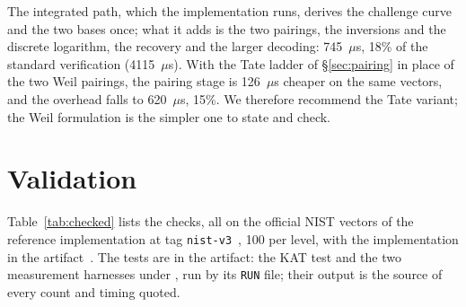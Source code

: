 \documentclass[version=submission]{iacrcc}
\begin{document}
The integrated path, which the implementation runs, derives the
challenge curve and the two bases once; what it adds is the two pairings,
the inversions and the discrete logarithm, the recovery and the larger
decoding: 745~$\mu$s, 18\% of the standard verification
(4115~$\mu$s). With the Tate ladder of \S\ref{sec:pairing} in place of the two Weil pairings, the pairing stage is 126~$\mu$s cheaper on the
same vectors, and the overhead falls to 620~$\mu$s, 15\%. We therefore recommend the Tate variant; the Weil formulation is the simpler one to state and check.

\section{Validation}
\label{sec:checked}

Table~\ref{tab:checked} lists the checks, all on the official NIST
vectors of the reference implementation at tag
\texttt{nist-v3}~\cite{the-sqisign-v3}, 100 per level, with the
implementation in the artifact~\cite{artifact}.
The tests are in the artifact: the KAT test and the two measurement
harnesses under , run by its \texttt{RUN} file;
their output is the source of every count and timing quoted.
\end{document}
